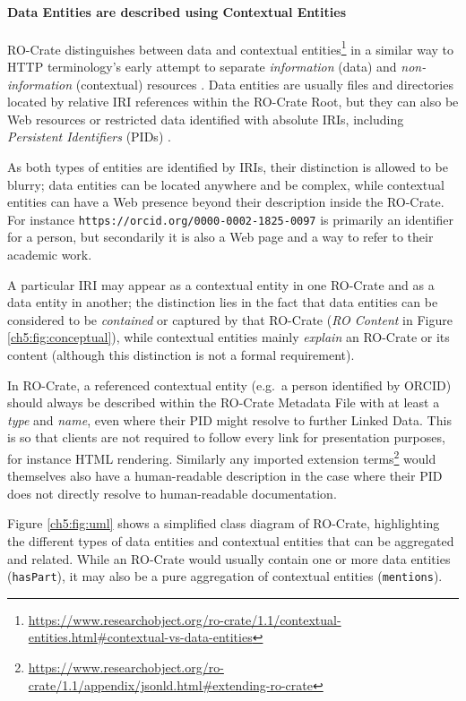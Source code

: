 \paragraph{Data Entities are described using Contextual
Entities}\label{ch5:contextualentities}

RO-Crate distinguishes between data and contextual
entities\footnote{\url{https://www.researchobject.org/ro-crate/1.1/contextual-entities.html\#contextual-vs-data-entities}} in a similar way to HTTP terminology's early
attempt to separate \emph{information} (data) and \emph{non-information}
(contextual) resources \cite{ch5-120}. Data entities are usually files and directories located by relative IRI
references within the RO-Crate Root, but they can also be Web resources
or restricted data identified with absolute IRIs, including
\emph{Persistent Identifiers} (PIDs)
\cite{McMurry 2017}.

As both types of entities are identified by IRIs, their distinction is
allowed to be blurry; data entities can be located anywhere and be
complex, while contextual entities can have a Web presence beyond their
description inside the RO-Crate. For instance
\texttt{https://orcid.org/0000-0002-1825-0097} is primarily an
identifier for a person, but secondarily it is also a Web page and a way
to refer to their academic work.

A particular IRI may appear as a contextual entity in one RO-Crate and
as a data entity in another; the distinction lies in the fact that data
entities can be considered to be \emph{contained} or captured by that
RO-Crate (\textit{RO Content} in Figure \vref{ch5:fig:conceptual}), 
while contextual entities mainly \emph{explain} an RO-Crate or its
content (although this distinction is not a formal requirement).

In RO-Crate, a referenced contextual entity (e.g.~a person identified by
ORCID) should always be described within the RO-Crate Metadata File with
at least a \emph{type} and \emph{name}, even where their PID might
resolve to further Linked Data. This is so that clients are not required
to follow every link for presentation purposes, for instance HTML
rendering. Similarly any imported extension
terms\footnote{\url{https://www.researchobject.org/ro-crate/1.1/appendix/jsonld.html\#extending-ro-crate}} would themselves also have a human-readable description in the
case where their PID does not directly resolve to human-readable
documentation.

Figure \vref{ch5:fig:uml} shows a simplified class
diagram of RO-Crate, highlighting the different types of data entities
and contextual entities that can be aggregated and related. While an
RO-Crate would usually contain one or more data entities
(\texttt{hasPart}), it may also be a pure aggregation of contextual
entities (\texttt{mentions}).


